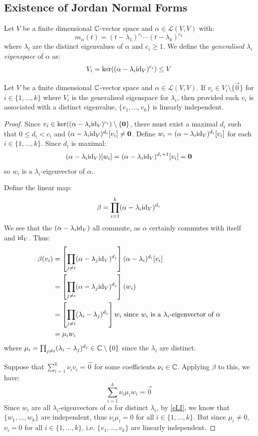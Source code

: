 \documentclass[../main.tex]{subfiles}
\begin{document}
\subsection{Existence of Jordan Normal Forms}
\begin{definition}
  Let $V$ be a finite dimensional $\mathbb{C}$-vector space and $\alpha \in \mathcal{L}(V, V)$ with:
  \[
    m_{\alpha}(t) = (t - \lambda_1)^{c_1} \cdots (t - \lambda_k)^{c_k}
  \]
  where $\lambda_i$ are the distinct eigenvalues of $\alpha$ and $c_i \geq 1$.
  We define the \textit{generalised $\lambda_i$ eigenspace} of $\alpha$ as:
  \[
    V_i = \ker((\alpha - \lambda_i \mathrm{id}_V)^{c_i}) \leq V
  \]
\end{definition}
\begin{lemma}
  Let $V$ be a finite dimensional $\mathbb{C}$-vector space and $\alpha \in \mathcal{L}(V, V)$.
  If $v_i \in V_i \setminus \{\vec{0}\}$ for $i \in \{1, \ldots, k\}$ where $V_i$ is the generalised eigenspace for $\lambda_i$, then provided each $v_i$ is associated with a distinct eigenvalue, $\{v_1, \ldots, v_k\}$ is linearly independent. \label{genLI}
\end{lemma}
\begin{proof}
  Since $v_i \in \ker((\alpha - \lambda_i \mathrm{id}_V)^{c_i}) \setminus \{\mathbf{\bm{0}}\}$, there must exist a maximal $d_i$ such that $0 \leq d_i < c_i$ and $(\alpha - \lambda_i \mathrm{id}_V)^{d_i}[v_i] \neq \mathbf{\bm{0}}$.
  Define $w_i = (\alpha - \lambda_i \mathrm{id}_V)^{d_i}[v_i]$ for each $i \in \{1, \ldots, k\}$.
  Since $d_i$ is maximal:
  \[
    (\alpha - \lambda_i \mathrm{id}_V)[w_i] = (\alpha - \lambda_i \mathrm{id}_V)^{d_i + 1}[v_i] = \mathbf{\bm{0}}
  \]
  so $w_i$ is a $\lambda_i$-eigenvector of $\alpha$.

  Define the linear map:
  \[
    \beta = \prod_{i = 1}^{k} (\alpha - \lambda_i \mathrm{id}_V)^{d_i}
  \]
  We see that the $(\alpha - \lambda_i \mathrm{id}_V)$ all commute, as $\alpha$ certainly commutes with itself and $\mathrm{id}_V$.
  Thus:
  \begin{align*}
    \beta(v_i) &= \left[\prod_{j \neq i} (\alpha - \lambda_j \mathrm{id}_V)^{d_j}\right](\alpha - \lambda_i)^{d_i}[v_i] \\
               &= \left[\prod_{j \neq i} (\alpha - \lambda_j \mathrm{id}_V)^{d_j}\right](w_i) \\
               &= \left[\prod_{j \neq i} (\lambda_i - \lambda_j)^{d_j}\right]w_i \text{ since $w_i$ is a $\lambda_i$-eigenvector of $\alpha$} \\
               &= \mu_i w_i
  \end{align*}
  where $\mu_i = \prod_{j \neq i} (\lambda_i - \lambda_j)^{d_j} \in \mathbb{C} \setminus \{0\}$ since the $\lambda_i$ are distinct.

  Suppose that $\sum_{i = 1}^{k} \nu_i v_i = \vec{0}$ for some coefficients $\nu_i \in \mathbb{C}$.
  Applying $\beta$ to this, we have:
  \[
    \sum_{i = 1}^{k} \nu_i \mu_i w_i = \vec{0}
  \]
  Since $w_i$ are all $\lambda_i$-eigenvectors of $\alpha$ for distinct $\lambda_i$, by \cref{eLI}, we know that $\{w_1, \ldots, w_k\}$ are independent, thus $\nu_i\mu_i = 0$ for all $i \in \{1, \ldots, k\}$.
  But since $\mu_i \neq 0$, $\nu_i = 0$ for all $i \in \{1, \ldots, k\}$, i.e. $\{v_1, \ldots, v_k\}$ are linearly independent.
\end{proof}
\end{document}
